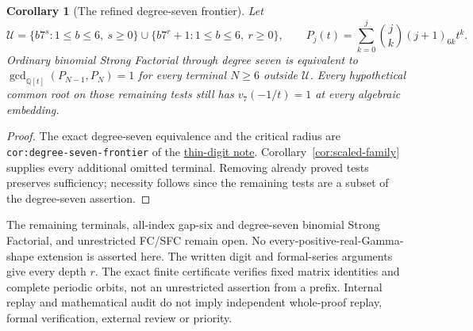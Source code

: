 \documentclass[11pt]{article}
\newtheorem{corollary}[lemma]{Corollary}
\begin{document}
\begin{corollary}[The refined degree-seven frontier]\label{cor:degree-seven-frontier}
Let
\[
 \mathcal U=\{b7^s:1\le b\le6,\ s\ge0\}
          \cup\{b7^r+1:1\le b\le6,\ r\ge0\},\qquad
 P_j(t)=\sum_{k=0}^j\binom jk(j+1)_{6k}t^k.
\]
Ordinary binomial Strong Factorial through degree seven is equivalent
to $\gcd_{\mathbb Q[t]}(P_{N-1},P_N)=1$ for every terminal
$N\ge6$ outside $\mathcal U$.
Every hypothetical common root on those remaining tests still has
$v_7(-1/t)=1$ at every algebraic embedding.
\end{corollary}
\begin{proof}
The exact degree-seven equivalence and the critical radius are
\texttt{cor:degree-seven-frontier} of the
\href{GAP_SIX_THIN_DIGIT_SFC.tex}{thin-digit note}.
Corollary~\ref{cor:scaled-family} supplies every additional omitted
terminal. Removing already proved tests preserves sufficiency;
necessity follows since the remaining tests are a subset of the
degree-seven assertion.
\end{proof}
The remaining terminals, all-index gap-six and degree-seven
binomial Strong Factorial, and unrestricted FC/SFC remain open.
No every-positive-real-Gamma-shape extension is asserted here.
The written digit and formal-series arguments give every depth $r$.
The exact finite certificate verifies fixed matrix identities and
complete periodic orbits, not an unrestricted assertion from a prefix.
Internal replay and mathematical audit do not imply independent
whole-proof replay, formal verification, external review or priority.
\end{document}
